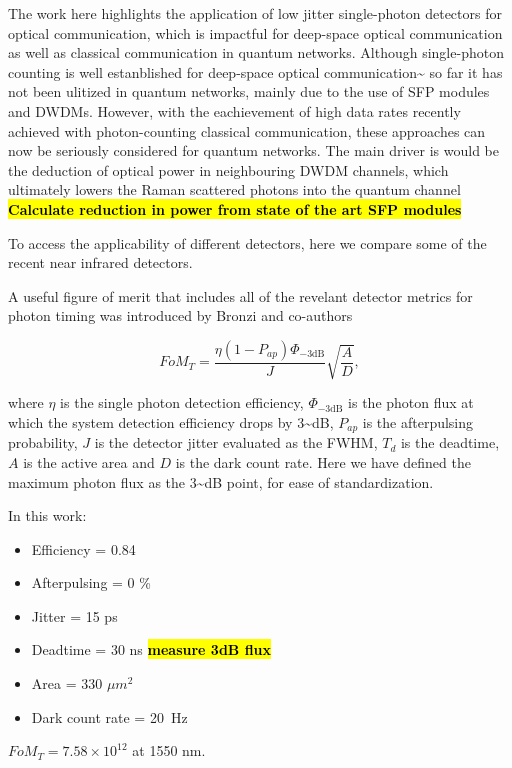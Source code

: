 \documentclass{optica-article}
\providecommand{\tightlist}{%
  \setlength{\itemsep}{0pt}\setlength{\parskip}{0pt}}
\begin{document}
The work here highlights the application of low jitter single-photon detectors for optical communication, which is impactful for deep-space optical communication as well as classical communication in quantum networks. Although single-photon counting is well estanblished for deep-space optical communication\textasciitilde{}\cite{Laser lunar, DSOC} so far it has not been ulitized in quantum networks, mainly due to the use of SFP modules and DWDMs. However, with the eachievement of high data rates recently achieved with photon-counting classical communication, these approaches can now be seriously considered for quantum networks. The main driver is would be the deduction of optical power in neighbouring DWDM channels, which ultimately lowers the Raman scattered photons into the quantum channel \cite{EraerdsRaman}
\textbf{\hl{Calculate reduction in power from state of the art SFP modules}}

To access the applicability of different detectors, here we compare some of the recent near infrared detectors.

A useful figure of merit that includes all of the revelant detector metrics for photon timing was introduced by Bronzi and co-authors \cite{Bronzi2016}

$$FoM_T = \frac{\eta  (1 - P_{ap})\Phi_{-3 \text{dB}}}{J} \sqrt{\frac{A}{D}},$$

where $\eta$ is the single photon detection efficiency, $\Phi_{-3 \text{dB}}$ is the photon flux at which the system detection efficiency drops by 3\textasciitilde dB, $P_{ap}$ is the afterpulsing probability, $J$ is the detector jitter evaluated as the FWHM, $T_d$ is the deadtime, $A$ is the active area and $D$ is the dark count rate. Here we have defined the maximum photon flux as the 3\textasciitilde dB point, for ease of standardization.

In this work:

\begin{itemize}
\tightlist
\item
  Efficiency = 0.84
\item
  Afterpulsing = 0 \%
\item
  Jitter = 15 ps
\item
  Deadtime = 30 ns \textbf{\hl{measure 3dB flux}}
\item
  Area = 330 $\mu m^2$
\item
  Dark count rate = 20~Hz
\end{itemize}

$FoM_T = 7.58 \times 10^{12}$ at 1550 nm.
\end{document}

